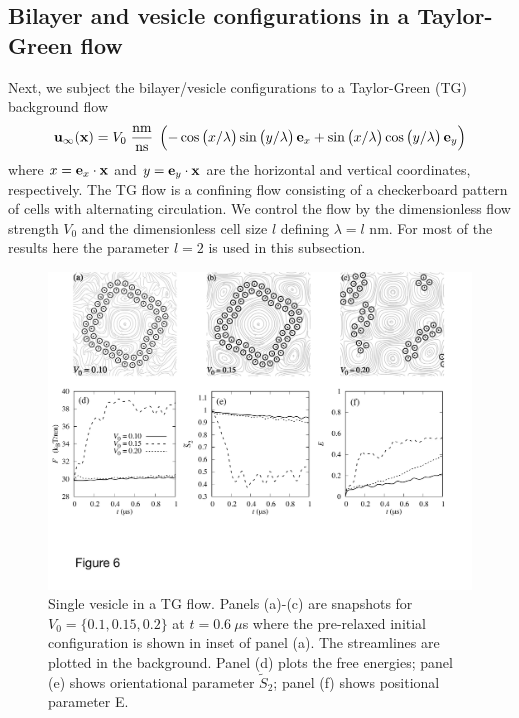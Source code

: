 \documentclass[prb,preprint,showpacs,preprintnumbers,amsmath,amssymb,longbibliography]{revtex4-1}
\newcommand{\xx}{\mathbf{x}}
\newcommand{\uu}{\mathbf{u}}
\begin{document}
\subsection{Bilayer and vesicle configurations in a Taylor-Green flow}
Next, we subject the bilayer/vesicle configurations to a 
Taylor-Green (TG) background flow
\begin{equation}
\label{eq:tg_flow}
\uu_\infty(\xx) = V_0\; \frac{\text{nm}}{\text{ns}}\;
\left(
-\cos\left(x/\lambda\right)
 \sin\left(y/\lambda\right)
         {\bf e}_x
         +\sin\left(x/\lambda\right)
         \cos\left(y/\lambda\right)
             {\bf e}_y\right)
\end{equation}
where $x = {\bf e}_x \cdot \xx$ and $y = {\bf e}_y \cdot \xx$
are the horizontal and vertical coordinates, respectively. 
The TG flow is a confining flow consisting of a checkerboard pattern
of cells with alternating circulation.  We control the flow by 
the dimensionless flow strength $V_0$ and the dimensionless cell size $l$
defining $\lambda = l$ nm.
For most of the results here the parameter $l=2$ is used in this subsection.
%

\begin{figure}
  \begin{center}
    \includegraphics[width=1.0\textwidth]{Figures/Figure6.pdf}        
  \end{center}
\caption{\label{fig:ves_TG} Single vesicle in a TG flow. Panels (a)-(c) are snapshots for $V_0=\{0.1, 0.15, 0.2\}$ at $t=0.6\ \mu$s where the pre-relaxed initial configuration is shown in inset of panel (a). The streamlines are plotted in the background.
Panel (d) plots the free energies; panel (e) shows orientational parameter $\tilde{S}_2$; panel (f) shows positional parameter E.
}
\end{figure}
\end{document}

